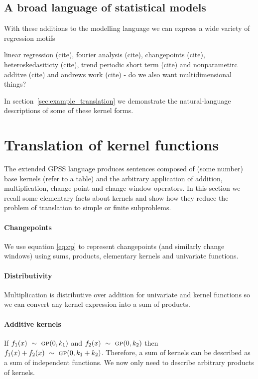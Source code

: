 \documentclass{article}
\begin{document}
\subsection{A broad language of statistical models}

With these additions to the modelling language we can express a wide variety of regression motifs

linear regression (cite), fourier analysis (cite), changepoints (cite), heteroskedasiticty (cite), trend periodic short term (cite) and nonparametirc additve (cite) and andrews work (cite) - do we also want multidimensional things?

In section~\ref{sec:example_translation} we demonstrate the natural-language descriptions of some of these kernel forms.

\section{Translation of kernel functions}
\label{sec:translation}

The extended GPSS language produces sentences composed of (some number) base kernels (refer to a table) and the arbitrary application of addition, multiplication, change point and change window operators. 
In this section we recall some elementary facts about kernels and show how they reduce the problem of translation to simple or finite subproblems.

\paragraph{Changepoints}

We use equation \eqref{eq:cp} to represent changepoints (and similarly change windows) using sums, products, elementary kernels and univariate functions.

\paragraph{Distributivity}

Multiplication is distributive over addition for univariate and kernel functions so we can convert any kernel expression into a sum of products.

\paragraph{Additive kernels}

If $f_1(x) \ \sim\  {\textsc{gp}}{}(0, k_1)$ and $f_2(x) \ \sim\  {\textsc{gp}}{}(0, k_2)$ then $f_1(x) + f_2(x) \ \sim\  {\textsc{gp}}{}(0, k_1 + k_2)$.
Therefore, a sum of kernels can be described as a sum of independent functions.
We now only need to describe arbitrary products of kernels.
\end{document}
